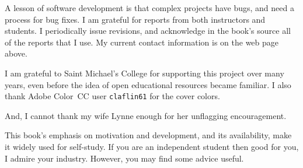 {\medskip
{}
A lesson of software
development is that complex projects have bugs,
and need a process for bug fixes.
I am grateful for reports from both instructors and students.
I periodically issue revisions, and acknowledge in the book's source
all of the reports that I use. 
My current contact information is on the web page above.

I am grateful to Saint Michael's College 
for supporting this project over many years, even before the idea of 
open educational resources became familiar.
I also thank Adobe Color~CC user \texttt{claflin61} for the cover colors.

And, I cannot thank my wife Lynne enough for her unflagging encouragement.



\newcommand{\classday}[1]{\textsc{#1}}
\newcommand{\colwidth}{1.25in}

\medskip
%
This book's emphasis on motivation and development,
and its availability, make it widely used for self-study.
If you are an independent student then good for you, I admire your industry.
However, you may find some advice useful.

}
